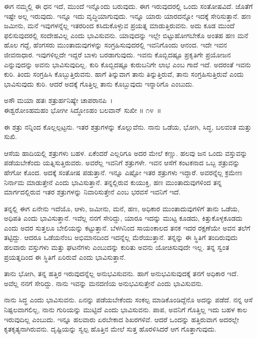 ಈಗ ನಮ್ಮಲ್ಲಿ ಈ ಧನ ಇದೆ, ಮುಂದೆ ಇನ್ನೊಂದು ಬರುವುದು. ಈಗ ಇರುವುದರಲ್ಲಿ ಒಂದು ಸಂತೋಷವಿದೆ. ಜೊತೆಗೆ ಇಷ್ಟೇ ಅಲ್ಲ ಇರುವುದು. ಇನ್ನೂ ಇದು ವೃದ್ಧಿಯಾಗುವುದು. ಇನ್ನೂ ಯಾರು ಯಾರದನ್ನೋ ಇದಕ್ಕೆ ಸೇರಿಸುತ್ತಾನೆ. ಹಣ ಜಮೀನು, ಮನೆ ಇವುಗಳನ್ನೆಲ್ಲ ಇತರರಿಂದ ಕಸಿದುಕೊಳ್ಳುವ ಪ್ರಯತ್ನ ಮಾಡುತ್ತಿರುವನು. ಅದು ಕೂಡ ಮುಂದೆ ಫಲಿಸುವುದರಲ್ಲಿ ಸಂದೇಹವಿಲ್ಲ ಎಂದು ಭಾವಿಸುವನು. ಯಾವುದನ್ನು ಇಲ್ಲೇ ಬಿಟ್ಟುಹೋಗಬೇಕೊ ಅಂತಹ ಹಣ ಮನೆ ಹೊಲ ಗದ್ದೆ, ಹೆಂಗಸರು ಮುಂತಾದುವುಗಳನ್ನು ಸಂಗ್ರಹಿಸುವುದರಲ್ಲಿ ಇವನಿಗೊಂದು ಆನಂದ. ಇದೇ ಇವನ ಜೀವನಾಧಾರ. ಇವುಗಳಿಲ್ಲದೇ ಇದ್ದರೆ ಬಾಳು ಬರಡಾಗುವುದು. ಇವನು ಕೊಬ್ಬಿದಷ್ಟೂ ಪ್ರಕೃತಿಗೇ ಪ್ರಯೋಜನ ಎನ್ನುವುದನ್ನು ಅವನು ಭಾವಿಸುವುದಿಲ್ಲ. ಕುರಿ ಕೊಬ್ಬಿದಷ್ಟೂ ಕುರುಬನಿಗೇ ಲಾಭ ಎಂಬ ಗಾದೆ ಇದೆ. ಅದರಂತೆ ಇವನು ಕುರಿ. ತಿಂದು ಸಂಗ್ರಹಿಸಿ ಕೊಬ್ಬುತ್ತಿರುವನು. ಹಾಗೆ ತಿನ್ನುವಾಗ ತಾನು ತಿನ್ನುತ್ತಿರುವೆ, ತಾನು ಸಂಗ್ರಹಿಸುತ್ತಿರುವೆ ಎಂದು ಭಾವಿಸುವುದು ಕುರಿ. ಆದರೆ ಅದಕ್ಕೆ ಗೊತ್ತಿಲ್ಲ ತಾನು ಕೊಬ್ಬುವುದು ಇನ್ನಾರಿಗೊ ಎಂಬುದು.

\begin{shloka}
ಅಸೌ ಮಯಾ ಹತಃ ಶತ್ರುರ್ಹನಿಷ್ಯೇ ಚಾಪರಾನಪಿ~।\\ಈಶ್ವರೋಽಹಮಹಂ ಭೋಗೀ ಸಿದ್ಧೋಽಹಂ ಬಲವಾನ್ ಸುಖೀ \hfill॥ ೧೪~॥
\end{shloka}

\begin{artha}
ಈ ಶತ್ರು ನನ್ನಿಂದ ಕೊಲ್ಲಲ್ಪಟ್ಟನು. ಇತರ ಶತ್ರುಗಳನ್ನು ಕೊಲ್ಲುವೆನು. ನಾನು ಒಡೆಯ, ಭೋಗಿ, ಸಿದ್ಧ, ಬಲವಂತ ಮತ್ತು ಸುಖಿ.
\end{artha}

ಆಸೆಯ ಹಾದಿಯಲ್ಲಿ ಶತ್ರುಗಳು ಬಹಳ. ಏಕೆಂದರೆ ಎಲ್ಲರಿಗೂ ಅದರ ಮೇಲೆ ಕಣ್ಣು. ಹಲವು ಜನ ಒಂದು ವಸ್ತುವನ್ನು ಪಡೆಯಬೇಕೆಂದು ಯತ್ನಿಸುತ್ತಿರುವರು. ಅವರೆಲ್ಲ ಇವನಿಗೆ ಶತ್ರುಗಳೇ. ಇವನ ಆಸೆಗೆ ಕಂಟಕನಾದ ಒಬ್ಬ ಶತ್ರುವನ್ನು ಹೇಗೋ ಕೊಂದ. ಅದಕ್ಕೆ ಸಂತೋಷ ಪಡುತ್ತಾನೆ. ಇನ್ನೂ ಎಷ್ಟೋ ಇತರ ಶತ್ರುಗಳು ಇದ್ದಾರೆ. ಅವರನ್ನೆಲ್ಲ ಕ್ರಮೇಣ ನಿರ್ನಾಮ ಮಾಡುತ್ತೇನೆ ಎಂದು ಭಾವಿಸುತ್ತಾನೆ. ತನ್ನಲ್ಲಿರುವ ಕುಯುಕ್ತಿ, ಹಣ ಮುಂತಾದುವುಗಳಿಂದ ತನ್ನ ಮಾರ್ಗದಲ್ಲಿರುವ ಇತರ ಶತ್ರುಗಳನ್ನು ನಿವಾರಿಸುತ್ತೇನೆ ಎಂಬ ಭರವಸೆ ಇವನಿಗೆ ಇದೆ.

ತನ್ನಲ್ಲಿ ಈಗ ಏನೇನು ಇದೆಯೊ, ಆಳು, ಜಮೀನು, ಮನೆ, ಹಣ, ಅಧಿಕಾರ ಮುಂತಾದುವುಗಳಿಗೆ ತಾನು ಒಡೆಯ, ಅಧಿಪತಿ ಎಂದು ಭಾವಿಸುತ್ತಾನೆ. ಇವೆಲ್ಲ ನನಗೆ ಸೇರಿದ್ದು, ಯಾರೂ ಇದನ್ನು ಮುಟ್ಟ ಕೂಡದು, ಕಿತ್ತುಕೊಳ್ಳಕೂಡದು ಎಂದು ಅದರ ಸುತ್ತಲೂ ಬೇಲಿಯನ್ನು ಕಟ್ಟುತ್ತಾನೆ. ಬೆಳಗಿನಿಂದ ಸಾಯಂಕಾಲದ ತನಕ ಇದರ ರಕ್ಷಣೆಯೇ ಅವನ ತಲೆಗೆ ತಟ್ಟಿದ್ದು. ಆದರೂ ಒಡೆಯನೆಂಬ ಅಭಿಮಾನದಿಂದ ಇದನ್ನೆಲ್ಲ ಮೆರೆಯುತ್ತಾನೆ. ತನ್ನನ್ನು ಈ ಸ್ಥಿತಿಗೆ ತಂದಿರುವುದು ಹಲವಾರು ವಸ್ತುಗಳು ಮತ್ತು ಘಟನೆಗಳು ಎಂಬುದನ್ನು ಕುರಿತು ಅವನು ಯೋಚಿಸುವುದೇ ಇಲ್ಲ. ತನ್ನ ಸ್ವಂತ ಪ್ರಯತ್ನದಿಂದ ಈ ಸ್ಥಿತಿಗೆ ಏರಿರುವೆ ಎಂದು ಭಾವಿಸುತ್ತಾನೆ.

ತಾನು ಭೋಗಿ, ತನ್ನ ಹತ್ತಿರ ಇರುವುದನ್ನೆಲ್ಲ ಅನುಭವಿಸುವನು. ಹಾಗೆ ಅನುಭವಿಸುವುದಕ್ಕೆ ತನಗೆ ಅಧಿಕಾರ ಇದೆ. ಅವೆಲ್ಲ ನನಗೆ ಸೇರಿದ್ದು. ನಾನು ಇವನ್ನು ಮನದಣಿಯ ಅನುಭವಿಸುತ್ತೇನೆ ಎಂದು ಭಾವಿಸುವನು.

ನಾನು ಸಿದ್ಧ ಎಂದು ಭಾವಿಸುವನು. ಏನನ್ನು ಪಡೆಯಬೇಕೆಂದು ಸಂಕಲ್ಪ ಮಾಡಿಕೊಂಡಿದ್ದೆನೊ ಅದನ್ನು ಪಡೆದೆ. ನನ್ನ ಆಸೆ ನಿಷ್ಫಲವಾಗಲಿಲ್ಲ, ನಾನು ಗುರಿಯನ್ನು ಮುಟ್ಟಿದೆ ಎಂದು ಭಾವಿಸುವನು. ಪಾಪ, ಅವನಿಗೆ ಗೊತ್ತಿಲ್ಲ ಇದು ಬಹಳ ಕಾಲ ಇರುವುದಿಲ್ಲ ಎಂಬುದು. ಇನ್ನೂ ಹಲವಾರು ಏರಬೇಕಾದ ಶಿಖರಗಳಿವೆ. ಆದರೆ ಒಂದನ್ನು ಹತ್ತಿರುವಾಗ ಅದರಲ್ಲೇ ಕೃತಕೃತ್ಯನಾಗಿರುವನು. ದೃಷ್ಟಿಯನ್ನು ಸ್ವಲ್ಪ ಹೊತ್ತಿನ ಮೇಲೆ ಸುತ್ತ ಹೊರಳಿಸಿದರೆ ಆಗ ಗೊತ್ತಾಗುವುದು.

